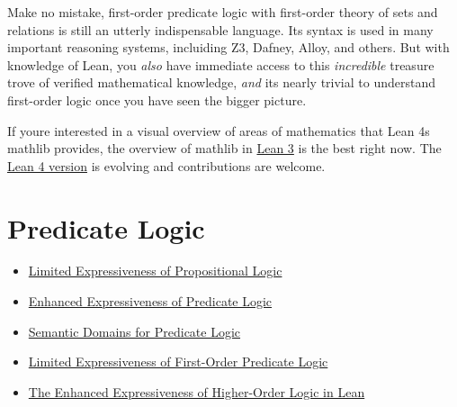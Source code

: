 \documentclass{book}
\providecommand{\tightlist}{%
  \setlength{\itemsep}{0pt}\setlength{\parskip}{0pt}}
\begin{document}
Make no mistake, first-order predicate logic with first-order theory of sets and relations is still an utterly indispensable language. It\textquotesingle s syntax is used in many important reasoning systems, incluiding Z3, Dafney, Alloy, and others. But with knowledge of Lean, you \emph{also} have immediate access to this \emph{incredible} treasure trove of verified mathematical knowledge, \emph{and} it\textquotesingle s nearly trivial to understand first-order logic once you have seen the bigger picture.

If you\textquotesingle re interested in a visual overview of areas of mathematics that Lean 4\textquotesingle s mathlib provides, the overview of mathlib in \href{https://leanprover-community.github.io/mathlib-overview.html}{Lean 3} is the best right now. The \href{https://leanprover-community.github.io/theories.html\#lean-mathematical-theories}{Lean 4 version} is evolving and contributions are welcome.

\hypertarget{book__pandoc__debug__src__predlogic.md}{}
\hypertarget{book__pandoc__debug__src__predlogic.md__predicate-logic}{%
\chapter{Predicate Logic}\label{book__pandoc__debug__src__predlogic.md__predicate-logic}}

\begin{itemize}
\tightlist
\item
  \protect\hyperlink{book__pandoc__debug__src__predlogic.md__limited-expressiveness-of-propositional-logic}{Limited Expressiveness of Propositional Logic}
\item
  \protect\hyperlink{book__pandoc__debug__src__predlogic.md__enhanced-expressiveness-of-predicate-logic}{Enhanced Expressiveness of Predicate Logic}
\item
  \protect\hyperlink{book__pandoc__debug__src__predlogic.md__semantic-domains-for-predicate-logic}{Semantic Domains for Predicate Logic}
\item
  \protect\hyperlink{book__pandoc__debug__src__predlogic.md__limited-expressiveness-of-first-order-predicate-logic}{Limited Expressiveness of First-Order Predicate Logic}
\item
  \protect\hyperlink{book__pandoc__debug__src__predlogic.md__the-enhanced-expressiveness-of-higher-order-logic-in-lean}{The Enhanced Expressiveness of Higher-Order Logic in Lean}
\end{itemize}
\end{document}
